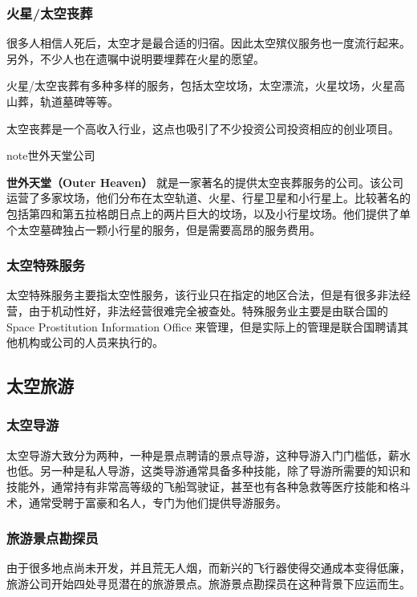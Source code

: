 \documentclass[letterpaper,10pt]{sphinxmanual}
\begin{document}
\subsubsection{火星/太空丧葬}
\label{profession:id34}
很多人相信人死后，太空才是最合适的归宿。因此太空殡仪服务也一度流行起来。另外，不少人也在遗嘱中说明要埋葬在火星的愿望。

火星/太空丧葬有多种多样的服务，包括太空坟场，太空漂流，火星坟场，火星高山葬，轨道墓碑等等。

太空丧葬是一个高收入行业，这点也吸引了不少投资公司投资相应的创业项目。

\begin{notice}{note}{世外天堂公司}

\textbf{世外天堂（Outer Heaven）} 就是一家著名的提供太空丧葬服务的公司。该公司运营了多家坟场，他们分布在太空轨道、火星、行星卫星和小行星上。比较著名的包括第四和第五拉格朗日点上的两片巨大的坟场，以及小行星坟场。他们提供了单个太空墓碑独占一颗小行星的服务，但是需要高昂的服务费用。
\end{notice}


\subsubsection{太空特殊服务}
\label{profession:id35}
太空特殊服务主要指太空性服务，该行业只在指定的地区合法，但是有很多非法经营，由于机动性好，非法经营很难完全被查处。特殊服务业主要是由联合国的 Space Prostitution Information Office 来管理，但是实际上的管理是联合国聘请其他机构或公司的人员来执行的。


\subsection{太空旅游}
\label{profession:id36}

\subsubsection{太空导游}
\label{profession:id37}
太空导游大致分为两种，一种是景点聘请的景点导游，这种导游入门门槛低，薪水也低。另一种是私人导游，这类导游通常具备多种技能，除了导游所需要的知识和技能外，通常持有非常高等级的飞船驾驶证，甚至也有各种急救等医疗技能和格斗术，通常受聘于富豪和名人，专门为他们提供导游服务。


\subsubsection{旅游景点勘探员}
\label{profession:id38}
由于很多地点尚未开发，并且荒无人烟，而新兴的飞行器使得交通成本变得低廉，旅游公司开始四处寻觅潜在的旅游景点。旅游景点勘探员在这种背景下应运而生。
\end{document}
